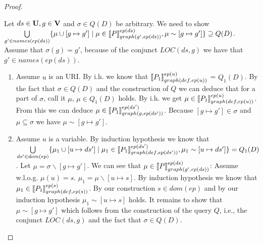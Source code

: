 \begin{proof}
\begin{enumerate}
			\bigskip\noindent
			Let $ds \in \mathbf{U}, g \in \mathbf{V}$ and $\sigma \in Q(D)$ be arbitrary.
			We need to show 
			$\bigcup\limits_{g' \in names(ep(ds))}\{ \mu \cup [g \mapsto g'] \mid \mu \in
				\llbracket P\rrbracket^{ep(ds)}_{graph(g',ep(ds))} , \mu \sim
			[g\mapsto g'] \} \supseteq Q(D) $. 
			Assume that $\sigma(g) = g'$, because of the conjunct $LOC(ds,g)$
			we have that $g' \in names(ep(ds))$.
			\begin{enumerate}
				\item Assume $u$ is an URI. 
					By i.h. we know that 
					$\llbracket P_1 \rrbracket^{ep(u)}_{graph(def,ep(u))}$ =
					$Q_1(D)$. By the fact that $\sigma \in Q(D)$ and the
					construction of $Q$ we can deduce that for a part of $\sigma$,
					call it $\mu$, $\mu \in Q_1(D)$ holds. By i.h. we get
					$\mu \in  \llbracket P_1 \rrbracket^{ep(u)}_{graph(def,ep(u))}$.
					From this we can deduce $\mu \in  \llbracket P_1
					\rrbracket^{ep(ds')}_{graph(g,ep(ds'))}$. Because $[g \mapsto
					g'] \in \sigma$ and $\mu \subseteq \sigma$ we have $\mu
					\sim [ g \mapsto g']$.

				\item Assume $u$ is a variable. By induction hypothesis we
					know that  $\bigcup\limits_{ds' \in dom(ep)} \{ \mu_1 \cup [u
						\mapsto ds'] \mid \mu_1 \in
						\llbracket P_1\rrbracket^{ep(ds')}_{graph(def,ep(ds'))},
					\mu_1 \sim [u\mapsto ds'] \}  = Q_1(D) $.
					Let $\mu = \sigma \backslash [g
					\mapsto g']$.
					We can see that $\mu \in \llbracket P
					\rrbracket^{ep(ds)}_{graph(g',ep(ds))}$:
					Assume w.l.o.g. $\mu(u) = s$.
					$\mu_1 = \mu \backslash [u \mapsto s]$. By induction hypothesis we know
					that $\mu_1 \in \llbracket P_1 \rrbracket^{ep(s)}_{graph(def,ep(s))}$. By our
					construction $s \in dom(ep)$ and by our induction hypothesis $\mu_1 \sim
					[u \mapsto s]$ holds. It remains to show that $\mu \sim
					[g \mapsto g']$
					which follows from the construction of the query $Q$, i.e., the conjunct
					$LOC(ds,g)$ and the fact that $\sigma \in Q(D)$.
			\end{enumerate}


\end{enumerate}
\end{proof}
